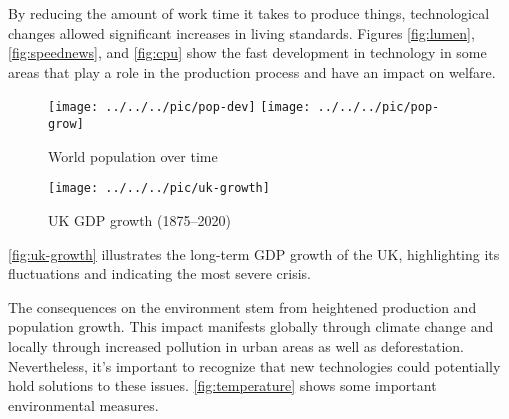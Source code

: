 {	By reducing the amount of work time it takes to produce things, technological changes allowed significant increases in living standards. Figures \ref{fig:lumen}, \ref{fig:speednews}, and \ref{fig:cpu} show the fast development in technology in some areas that play a role in the production process and have an impact on welfare.
		
		\begin{figure}[H]
			\begin{center}
				\texttt{[image: ../../../pic/pop-dev]}
				\texttt{[image: ../../../pic/pop-grow]}	
			\end{center}
			\caption{World population over time}\label{fig:popstick}
		\end{figure}
	
	\begin{figure}[h]
		\begin{center}
			\texttt{[image: ../../../pic/uk-growth]}
		\end{center}\caption{UK GDP growth (1875–2020)}\label{fig:uk-growth} 
	\end{figure}
	
	\item[Economic cycles] \autoref{fig:uk-growth} illustrates the long-term GDP growth of the UK, highlighting its fluctuations and indicating the most severe crisis.
		
	\item[Population growth]	
	
	\item[Environmental consequences]	The consequences on the environment stem from heightened production and population growth. This impact manifests globally through climate change and locally through increased pollution in urban areas as well as deforestation. Nevertheless, it's important to recognize that new technologies could potentially hold solutions to these issues. \autoref{fig:temperature} shows some important environmental measures.
}

